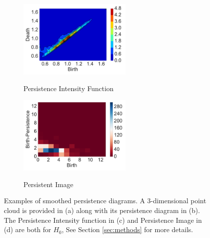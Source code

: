 \documentclass[12pt]{article}
\begin{document}
\begin{figure}[htbp]
    \begin{subfigure}{.48\textwidth}
    \centering
        \caption{Persistence Intensity Function}
        \includegraphics[height = 1.5in]{figure_5_kernel.pdf}
    \label{fig:examplestest5}
  \end{subfigure}
    \begin{subfigure}{.48\textwidth}
    \centering
        \caption{Persistent Image}
        \includegraphics[height = 1.5in]{figure_5_pimage_fun.pdf}
    \label{fig:examplestest8}
  \end{subfigure}
   \caption{Examples of smoothed persistence diagrams.  A 3-dimensional point cloud is provided in (a) along with its persistence diagram in (b).
The Persistence Intensity function in (c) and Persistence Image in (d) are both for $H_0$,
See Section \ref{sec:methods} for more details.}
   \label{fig:examples}
\end{figure}
\end{document}
